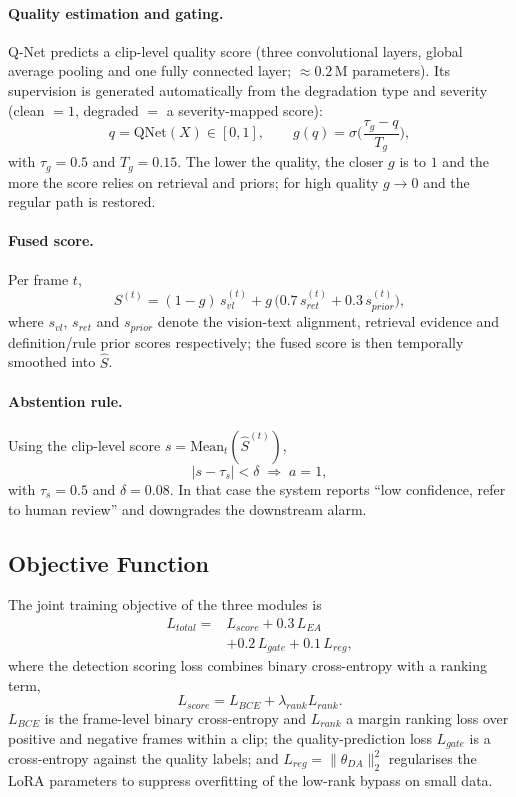 \paragraph{Quality estimation and gating.} Q-Net predicts a clip-level quality score (three convolutional layers, global average pooling and one fully connected layer; $\approx 0.2$\,M parameters). Its supervision is generated automatically from the degradation type and severity (clean $=1$, degraded $=$ a severity-mapped score):
\begin{equation}
q = \mathrm{QNet}(X) \in [0,1], \qquad
g(q) = \sigma\!\Big(\frac{\tau_g - q}{T_g}\Big),
\end{equation}
with $\tau_g{=}0.5$ and $T_g{=}0.15$. The lower the quality, the closer $g$ is to $1$ and the more the score relies on retrieval and priors; for high quality $g \to 0$ and the regular path is restored.

\paragraph{Fused score.} Per frame $t$,
\begin{equation}
S^{(t)} = (1 - g)\, s_{vl}^{(t)} + g\,\big(0.7\, s_{ret}^{(t)} + 0.3\, s_{prior}^{(t)}\big),
\end{equation}
where $s_{vl}$, $s_{ret}$ and $s_{prior}$ denote the vision-text alignment, retrieval evidence and definition/rule prior scores respectively; the fused score is then temporally smoothed into $\hat{S}$.

\paragraph{Abstention rule.} Using the clip-level score $s = \mathrm{Mean}_t(\hat{S}^{(t)})$,
\begin{equation}
\lvert s - \tau_s \rvert < \delta \;\Longrightarrow\; a = 1,
\end{equation}
with $\tau_s{=}0.5$ and $\delta{=}0.08$. In that case the system reports ``low confidence, refer to human review'' and downgrades the downstream alarm.

\subsection{Objective Function}

The joint training objective of the three modules is
\begin{align}
L_{total} = {} & L_{score} + 0.3\,L_{EA} \nonumber \\
& + 0.2\,L_{gate} + 0.1\,L_{reg},
\end{align}
where the detection scoring loss combines binary cross-entropy with a ranking term,
\begin{equation}
L_{score} = L_{BCE} + \lambda_{rank} L_{rank}.
\end{equation}
$L_{BCE}$ is the frame-level binary cross-entropy and $L_{rank}$ a margin ranking loss over positive and negative frames within a clip; the quality-prediction loss $L_{gate}$ is a cross-entropy against the quality labels; and $L_{reg} = \lVert \theta_{DA} \rVert_2^2$ regularises the LoRA parameters to suppress overfitting of the low-rank bypass on small data.

